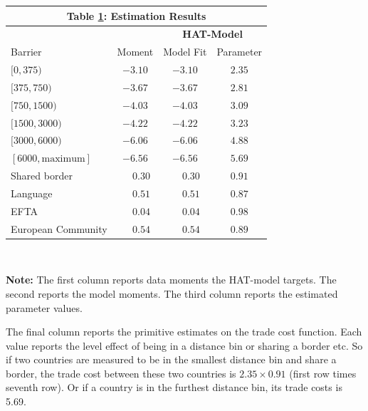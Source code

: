 \documentclass[12pt,pdftex]{article}
\renewcommand{\arraystretch}{1.1}
\begin{document}
\begin{onehalfspacing}
\begin{table}[t]
\small
\begin{center}
\setlength {\tabcolsep}{5.5mm}
\renewcommand{\arraystretch}{1.50}\label{tb-grav-est}
\begin{tabular}[t]{l c c c}
\multicolumn{4}{c}{{\normalsize\textbf{Table \ref{tb-grav-est}: Estimation Results}} }
\\\hline \hline
& & \multicolumn{2}{c}{\textbf{HAT-Model}}  \\
\cmidrule(lr){3-4}
Barrier& Moment & Model Fit & Parameter \\
\hline $[0,375)$                &$-3.10 $           & $-3.10 $              & $2.35$           \\
$[375,750)$                     &$-3.67 $           & $-3.67 $              & $2.81$           \\
$[750,1500)$                    &$-4.03 $           & $-4.03 $              & $3.09$           \\
$[1500,3000)$                   &$-4.22 $           & $-4.22 $              & $3.23$           \\
$[3000,6000)$                   &$-6.06 $           & $-6.06 $              & $4.88$           \\
$[6000,\mbox{maximum}]$         &$-6.56 $           & $-6.56 $              & $5.69$           \\
Shared border                   &$\phantom{-}0.30$  & $\phantom{-}0.30$     & $0.91$  \\
Language                        &$\phantom{-}0.51$  & $\phantom{-}0.51$     & $0.87$  \\
EFTA                            &$\phantom{-}0.04$  & $\phantom{-}0.04$     & $0.98$  \\
European Community              &$\phantom{-}0.54$  & $\phantom{-}0.54$     & $0.89$  \\
\hline
\end{tabular}
\\[0.5ex]
\parbox{5.0in}{\footnotesize \textbf{Note:} The first column reports data moments the HAT-model targets. The second reports the model moments. The third column reports the estimated parameter values.}
\end{center}
\end{table}

The final column reports the primitive estimates on the trade cost function. Each value reports the level effect of being in a distance bin or sharing a border etc.  So if two countries are measured to be in the smallest distance bin and share a border, the trade cost between these two countries is $2.35 \times 0.91$ (first row times seventh row). Or if a country is in the furthest distance bin, its trade costs is 5.69.


\end{onehalfspacing}
\end{document}
